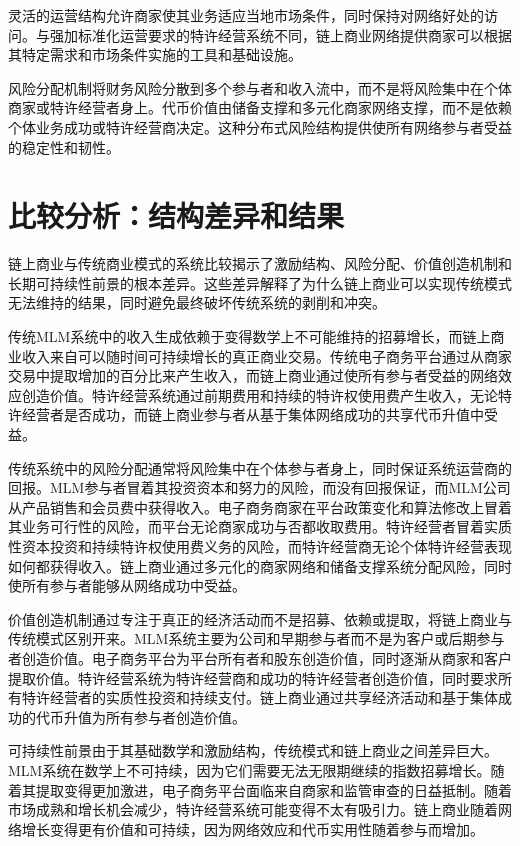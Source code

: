 \documentclass[
  Letterpaper,
]{scrbook}
\begin{document}
灵活的运营结构允许商家使其业务适应当地市场条件，同时保持对网络好处的访问。与强加标准化运营要求的特许经营系统不同，链上商业网络提供商家可以根据其特定需求和市场条件实施的工具和基础设施。

风险分配机制将财务风险分散到多个参与者和收入流中，而不是将风险集中在个体商家或特许经营者身上。代币价值由储备支撑和多元化商家网络支撑，而不是依赖个体业务成功或特许经营商决定。这种分布式风险结构提供使所有网络参与者受益的稳定性和韧性。

\section{比较分析：结构差异和结果}\label{ux6bd4ux8f83ux5206ux6790ux7ed3ux6784ux5deeux5f02ux548cux7ed3ux679c}

链上商业与传统商业模式的系统比较揭示了激励结构、风险分配、价值创造机制和长期可持续性前景的根本差异。这些差异解释了为什么链上商业可以实现传统模式无法维持的结果，同时避免最终破坏传统系统的剥削和冲突。

传统MLM系统中的收入生成依赖于变得数学上不可能维持的招募增长，而链上商业收入来自可以随时间可持续增长的真正商业交易。传统电子商务平台通过从商家交易中提取增加的百分比来产生收入，而链上商业通过使所有参与者受益的网络效应创造价值。特许经营系统通过前期费用和持续的特许权使用费产生收入，无论特许经营者是否成功，而链上商业参与者从基于集体网络成功的共享代币升值中受益。

传统系统中的风险分配通常将风险集中在个体参与者身上，同时保证系统运营商的回报。MLM参与者冒着其投资资本和努力的风险，而没有回报保证，而MLM公司从产品销售和会员费中获得收入。电子商务商家在平台政策变化和算法修改上冒着其业务可行性的风险，而平台无论商家成功与否都收取费用。特许经营者冒着实质性资本投资和持续特许权使用费义务的风险，而特许经营商无论个体特许经营表现如何都获得收入。链上商业通过多元化的商家网络和储备支撑系统分配风险，同时使所有参与者能够从网络成功中受益。

价值创造机制通过专注于真正的经济活动而不是招募、依赖或提取，将链上商业与传统模式区别开来。MLM系统主要为公司和早期参与者而不是为客户或后期参与者创造价值。电子商务平台为平台所有者和股东创造价值，同时逐渐从商家和客户提取价值。特许经营系统为特许经营商和成功的特许经营者创造价值，同时要求所有特许经营者的实质性投资和持续支付。链上商业通过共享经济活动和基于集体成功的代币升值为所有参与者创造价值。

可持续性前景由于其基础数学和激励结构，传统模式和链上商业之间差异巨大。MLM系统在数学上不可持续，因为它们需要无法无限期继续的指数招募增长。随着其提取变得更加激进，电子商务平台面临来自商家和监管审查的日益抵制。随着市场成熟和增长机会减少，特许经营系统可能变得不太有吸引力。链上商业随着网络增长变得更有价值和可持续，因为网络效应和代币实用性随着参与而增加。
\end{document}
